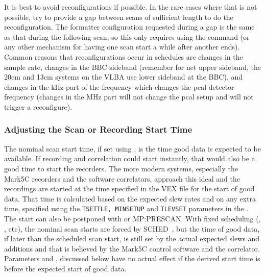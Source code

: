 \documentclass{report}
\newcommand{\schedb}{{\sc SCHED~}}
\begin{document}
It is best to avoid reconfigurations if possible.  In the rare cases
where that is not possible, try to provide a gap between scans of
sufficient length to do the reconfiguration.  The formatter
configuration requested during a gap is the same as that during the
following scan, so this only requires using the  command (or any other mechanism for having one scan
start a while after another ends).  Common reasons that
reconfigurations occur in schedules are changes in the sample rate,
changes in the BBC sideband (remember for net upper sideband, the 20cm
and 13cm systems on the VLBA use lower sideband at the BBC), and
changes in the kHz part of the frequency which changes the pcal
detector frequency (changes in the MHz part will not change the pcal
setup and will not trigger a reconfigure).

\subsubsection{\label{SSSEC:Starttime}Adjusting the Scan or Recording
Start Time}

The nominal scan start time, if set using , is the time good data is expected to be available.
If recording and correlation could start instantly, that would also be
a good time to start the recorders.  The more modern systems,
especially the Mark5C recorders and the software correlators, approach
this ideal and the recordings are started at the time specified in the
VEX file for the start of good data.  That time is calculated based on
the expected slew rates and on any extra time, specified using the
{\tt TSETTLE, MINSETUP} and {\tt TLEVSET} parameters in the
.  The start can also be
postponed with  or 
{MP:PRESCAN}.  With fixed scheduling (,
, etc), the nominal scan starts are
forced by \schedb, but the time of good data, if later than the
scheduled scan start, is still set by the actual expected slews and
additions and that is believed by the Mark5C control software and the
correlator.  Parameters  and
, discussed below have no actual
effect if the derived start time is before the expected start of good
data.
\end{document}
